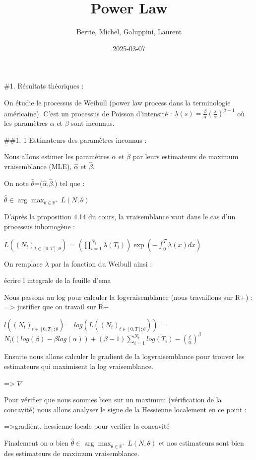 \documentclass[
]{article}
\title{Power Law}
\author{Berrie, Michel, Galuppini, Laurent}
\date{2025-03-07}
\begin{document}
\maketitle

\#1. Résultats théoriques :

On étudie le processus de Weibull (power law process dans la
terminologie américaine). C'est un processus de Poisson d'intensité :
\(\lambda(s)=\frac{\beta}{\alpha}(\frac{s}{\alpha})^{\beta-1}\) où les
paramètres \(\alpha\) et \(\beta\) sont inconnus.

\#\#1. 1 Estimateurs des paramètres inconnus :

Nous allons estimer les paramètres \(\alpha\) et \(\beta\) par leurs
estimateurs de maximum vraisemblance (MLE), \(\hat{\alpha}\) et
\(\hat{\beta}\).

On note \(\hat {\theta}\)=(\(\hat{\alpha}\),\(\hat{\beta}\).) tel que :

\(\hat{\theta} \in \arg\max_{\theta \in \mathbb{R}^+}  L(N,\theta)\)

D'après la proposition 4.14 du cours, la vraisemblance vaut dans le cas
d'un processus inhomogène :

\(L((N_t)_{t \in[0,T]; \theta})\) =
\(\left( \prod_{i=1}^{N_t}\lambda(T_i) \right) \exp \left(-\int_0^T \lambda(x)dx \right)\)

On remplace \(\lambda\) par la fonction du Weibull ainsi :

écrire l integrale de la feuille d'ema

Nous passons au log pour calculer la logvraisemblance (nous travaillons
sur R+) : =\textgreater{} justifier que on travail sur R+

\(l((N_t)_{t \in[0,T]; \theta})=log(L((N_t)_{t \in[0,T]; \theta}))\) =
\(N_t((log(\beta)-\beta log(\alpha))+ (\beta-1) \sum_{i=1}^{N_t}log(T_i)-(\frac{t}{\alpha})^\beta\)

Ensuite nous allons calculer le gradient de la logvraisemblance pour
trouver les estimateurs qui maximisent la log vraisemblance.

=\textgreater{} \(\nabla\)

Pour vérifier que nous sommes bien sur un maximum (vérification de la
concavité) nous allons analyser le signe de la Hessienne localement en
ce point :

=\textgreater gradient, hessienne locale pour verifier la concavité

Finalement on a bien
\(\hat{\theta} \in \arg\max_{\theta \in \mathbb{R}^+}  L(N,\theta)\) et
nos estimateurs sont bien des estimateurs de maximum vraisemblance.
\end{document}
